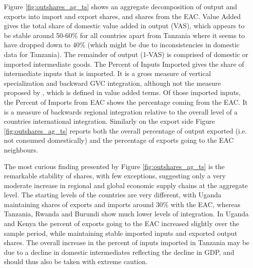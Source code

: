 \documentclass[a4paper]{article}
\begin{document}

Figure \ref{fig:outshares_ag_ts} shows an aggregate decomposition of output and exports into import and export shares, and shares from the EAC. Value Added gives the total share of domestic value added in output (VAS), which appears to be stable around 50-60\% for all countries apart from Tanzania where it seems to have dropped down to 40\% (which might be due to inconsistencies in domestic data for Tanzania). The remainder of output (1-VAS) is comprised of domestic or imported intermediate goods. The Percent of Inputs Imported gives the share of intermediate inputs that is imported. It is a gross measure of vertical specialization and backward GVC integration, although not the measure proposed by \citet{hummels2001nature}, which is defined in value added terms. Of those imported inputs, the Percent of Imports from EAC shows the percentage coming from the EAC. It is a measure of backwards regional integration relative to the overall level of a countries international integration.  Similarly on the export side Figure \ref{fig:outshares_ag_ts} reports both the overall percentage of output exported (i.e. not consumed domestically) and the percentage of exports going to the EAC neighbours. \newline

The most curious finding presented by Figure \ref{fig:outshares_ag_ts} is the remarkable stability of shares, with few exceptions, suggesting only a very moderate increase in regional and global economic supply chains at the aggregate level. The starting levels of the countries are very different, with Uganda maintaining shares of exports and imports around 30\% with the EAC, whereas Tanzania, Rwanda and Burundi show much lower levels of integration. In Uganda and Kenya the percent of exports going to the EAC increased slightly over the sample period, while maintaining stable imported inputs and exported output shares. The overall increase in the percent of inputs imported in Tanzania may be due to a decline in domestic intermediates reflecting the decline in GDP, and should thus also be taken with extreme caution.  

\end{document}
